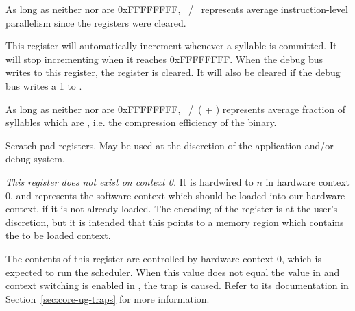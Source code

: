 As long as neither  nor  are 0xFFFFFFFF,
~/~ represents average instruction-level parallelism since
the registers were cleared.

\debugCanWrite{}


This register will automatically increment whenever a  syllable is
committed. It will stop incrementing when it reaches 0xFFFFFFFF. When the debug
bus writes to this register, the register is cleared. It will also be cleared
if the debug bus writes a 1 to .

As long as neither  nor  are 0xFFFFFFFF,
~/~( + ) represents average fraction of syllables
which are , i.e. the compression efficiency of the binary.

\debugCanWrite{}


Scratch pad registers. May be used at the discretion of the application and/or
debug system.

\debugCanWrite{}
\coreCanWrite{}


\emph{This register does not exist on context 0.} It is hardwired to
$n$ in hardware context 0, and represents the software context which
should be loaded into our hardware context, if it is not already loaded. The
encoding of the register is at the user's discretion, but it is intended that
this points to a memory region which contains the to be loaded context.

The contents of this register are controlled by hardware context 0, which is 
expected to run the scheduler. When this value does not equal the value in 
 and context switching is enabled in , the 
 trap is caused. Refer to its documentation in
Section~\ref{sec:core-ug-traps} for more information.


